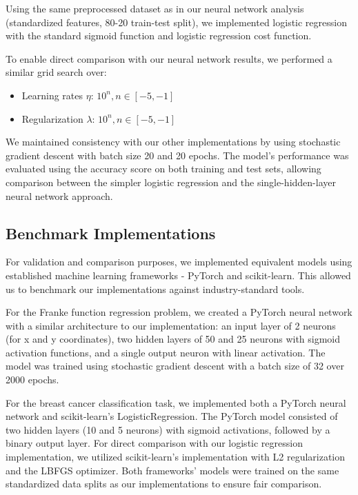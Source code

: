 Using the same preprocessed dataset as in our neural network analysis (standardized features, 80-20 train-test split), we implemented logistic regression with the standard sigmoid function and logistic regression cost function.

To enable direct comparison with our neural network results, we performed a similar grid search over:

\begin{itemize}
    \item Learning rates \( \eta \): \( 10^{n}, n \in [-5, -1] \)
    \item Regularization \( \lambda \): \( 10^{n}, n \in [-5, -1] \)
\end{itemize}
We maintained consistency with our other implementations by using stochastic gradient descent with batch size 20 and 20 epochs. The model's performance was evaluated using the accuracy score on both training and test sets, allowing comparison between the simpler logistic regression and the single-hidden-layer neural network approach.

\subsection{Benchmark Implementations}
For validation and comparison purposes, we implemented equivalent models using established machine learning frameworks - PyTorch\cite{PyTorch} and scikit-learn\cite{scikit-learn}. This allowed us to benchmark our implementations against industry-standard tools.

For the Franke function regression problem, we created a PyTorch neural network with a similar architecture to our implementation: an input layer of 2 neurons (for x and y coordinates), two hidden layers of 50 and 25 neurons with sigmoid activation functions, and a single output neuron with linear activation. The model was trained using stochastic gradient descent with a batch size of 32 over 2000 epochs.

For the breast cancer classification task, we implemented both a PyTorch neural network and scikit-learn's LogisticRegression. The PyTorch model consisted of two hidden layers (10 and 5 neurons) with sigmoid activations, followed by a binary output layer. For direct comparison with our logistic regression implementation, we utilized scikit-learn's implementation with L2 regularization and the LBFGS optimizer. Both frameworks' models were trained on the same standardized data splits as our implementations to ensure fair comparison.

